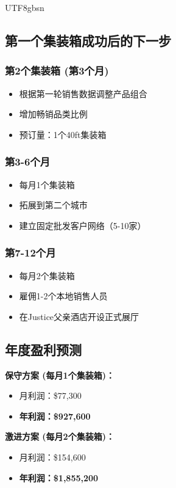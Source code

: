 \documentclass[12pt,a4paper]{article}
\begin{document}
\begin{CJK}{UTF8}{gbsn}

\subsection{第一个集装箱成功后的下一步}

\subsubsection{第2个集装箱 (第3个月)}
\begin{itemize}
    \item 根据第一轮销售数据调整产品组合
    \item 增加畅销品类比例
    \item 预订量：1个40ft集装箱
\end{itemize}

\subsubsection{第3-6个月}
\begin{itemize}
    \item 每月1个集装箱
    \item 拓展到第二个城市
    \item 建立固定批发客户网络（5-10家）
\end{itemize}

\subsubsection{第7-12个月}
\begin{itemize}
    \item 每月2个集装箱
    \item 雇佣1-2个本地销售人员
    \item 在Justice父亲酒店开设正式展厅
\end{itemize}

\subsection{年度盈利预测}

\textbf{保守方案 (每月1个集装箱)：}
\begin{itemize}
    \item 月利润：\$77,300
    \item \textbf{年利润：\$927,600}
\end{itemize}

\textbf{激进方案 (每月2个集装箱)：}
\begin{itemize}
    \item 月利润：\$154,600
    \item \textbf{年利润：\$1,855,200}
\end{itemize}

\end{CJK}
\end{document}
